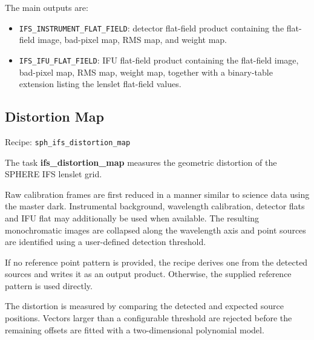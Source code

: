 The main outputs are:

\begin{itemize}
\item \texttt{IFS\_INSTRUMENT\_FLAT\_FIELD}: detector flat-field product
containing the flat-field image, bad-pixel map, RMS map, and weight map.

\item \texttt{IFS\_IFU\_FLAT\_FIELD}: IFU flat-field product containing
the flat-field image, bad-pixel map, RMS map, weight map, together with
a binary-table extension listing the lenslet flat-field values.

\end{itemize}





\subsection{Distortion Map}

Recipe:
\texttt{sph\_ifs\_distortion\_map}

The task \textbf{ifs\_distortion\_map} measures the geometric distortion
of the SPHERE IFS lenslet grid.

Raw calibration frames are first reduced in a manner similar to science
data using the master dark. Instrumental background, wavelength calibration, detector flats and IFU flat may additionally be used when available. The resulting monochromatic images are collapsed along the
wavelength axis and point sources are identified using a user-defined
detection threshold.

If no reference point pattern is provided, the recipe derives one from the
detected sources and writes it as an output product. Otherwise, the supplied
reference pattern is used directly.

The distortion is measured by comparing the detected and expected source
positions. Vectors larger than a configurable threshold are rejected before
the remaining offsets are fitted with a two-dimensional polynomial model.

